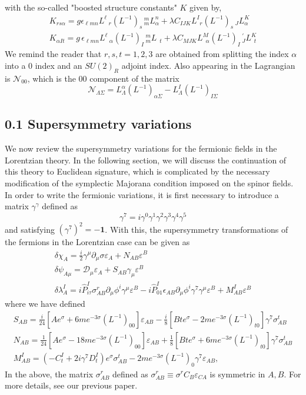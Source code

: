 \documentclass{article}
\begin{document}
with the so-called "boosted structure constants" \(K\) given by,
\[
\begin{array}{l}
K_{r s \alpha}=g \epsilon_{\ell m n} L^{\ell} \,_{r}(L^{-1})_{s} \,_{m}^{m} L_{\alpha}^{n}+\lambda C_{I J K} L_{\,\,\,r}^{I}(L^{-1})_{s} \,_{J} L_{\alpha}^{K} \\
K_{\alpha I t}=g \, \epsilon_{\ell m n} L^{\ell} \,_{\alpha}(L^{-1})_{I} \,_{m}^{m} L_{\,\,\,t}+\lambda C_{M J K} L_{\,\,\, \alpha}^{M}(L^{-1})_{I} \,_{J}^{\prime} L_{\,\,\,t}^{K}
\end{array}
\]
We remind the reader that \(r, s, t=1,2,3\) are obtained from splitting the index \(\alpha\) into a 0 index and an \(S U(2)_{R}\) adjoint index. Also appearing in the Lagrangian is \(\mathcal{N}_{00}\), which is the 00 component of the matrix
\[
\mathcal{N}_{\Lambda \Sigma}=L_{\Lambda}^{\alpha}\left(L^{-1}\right)_{\alpha \Sigma}-L_{\Lambda}^{I}\left(L^{-1}\right)_{I \Sigma}
\]
\subsection*{0.1 Supersymmetry variations}
We now review the supersymmetry variations for the fermionic fields in the Lorentzian theory. In the following section, we will discuss the continuation of this theory to Euclidean signature, which is complicated by the necessary modification of the symplectic Majorana condition imposed on the spinor fields. In order to write the fermionic variations, it is first necessary to introduce a matrix \(\gamma^{\gamma}\) defined as
\[
\gamma^{7}=i\gamma^{0}\gamma^{1}\gamma^{2}\gamma^{3}\gamma^{4}\gamma^{5}
\]
and satisfying \(\left(\gamma^{7}\right)^{2}=-\mathbf{1}\). With this, the supersymmetry transformations of the fermions in the Lorentzian case can be given as
\[
\begin{array}{c}
\delta \chi_{A}=\frac{i}{2}\gamma^{\mu}\partial_{\mu}\sigma \varepsilon_{A}+N_{AB} \varepsilon^{B} \\
\delta \psi_{A \mu}=\mathcal{D}_{\mu} \varepsilon_{A}+S_{AB} \gamma_{\mu} \varepsilon^{B} \\
\delta \lambda_{A}^{I}=i\hat{P}_{i \tau}^{I} \sigma_{AB}^{r} \partial_{\mu} \phi^{i} \gamma^{\mu} \varepsilon^{B}-i\hat{P}_{01}^{I} \epsilon_{AB} \partial_{\mu} \phi^{i} \gamma^{7} \gamma^{\mu} \varepsilon^{B}+M_{AB}^{I} \varepsilon^{B}
\end{array}
\]
where we have defined
\[
\begin{array}{l}
S_{AB}=\frac{i}{24}[A e^{\sigma}+6m e^{-3\sigma}(L^{-1})_{00}] \varepsilon_{AB}-\frac{i}{8}[B t e^{\sigma}-2m e^{-3\sigma}(L^{-1})_{t0}] \gamma^{7} \sigma_{AB}^{t} \\
N_{AB}=\frac{1}{24}[A e^{\sigma}-18m e^{-3\sigma}(L^{-1})_{00}] \varepsilon _{AB}+\frac{1}{8}[B t e^{\sigma}+6m e^{-3\sigma}(L^{-1})_{t0}] \gamma^{7}\sigma_{AB}^{t} \\
M_{AB}^{I}=(-C_{t}^{I}+2i\gamma^{7} D_{t}^{I}) e^{\sigma} \sigma_{AB}^{t}-2m e^{-3\sigma}(L^{-1})_{0} \gamma^{7} \varepsilon_{AB},
\end{array}
\]
In the above, the matrix \(\sigma_{AB}^{r}\) defined as \(\sigma_{AB}^{r} \equiv \sigma^{r} C_{B} \varepsilon_{C A}\) is symmetric in \(A, B\). For more details, see our previous paper.
\end{document}
